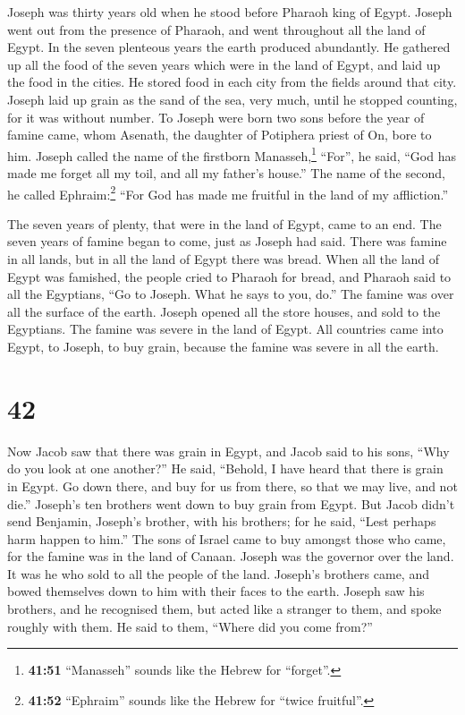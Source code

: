  Joseph was thirty years old when he stood before Pharaoh
king of Egypt. Joseph went out from the presence of Pharaoh, and went
throughout all the land of Egypt.  In the seven plenteous
years the earth produced abundantly.  He gathered up all
the food of the seven years which were in the land of Egypt, and laid up
the food in the cities. He stored food in each city from the fields
around that city.  Joseph laid up grain as the sand of
the sea, very much, until he stopped counting, for it was without
number.  To Joseph were born two sons before the year of
famine came, whom Asenath, the daughter of Potiphera priest of On, bore
to him.  Joseph called the name of the firstborn
Manasseh,\footnote{\textbf{41:51} ``Manasseh'' sounds like the Hebrew
  for ``forget''.} ``For'', he said, ``God has made me forget all my
toil, and all my father's house.''  The name of the
second, he called Ephraim:\footnote{\textbf{41:52} ``Ephraim'' sounds
  like the Hebrew for ``twice fruitful''.} ``For God has made me
fruitful in the land of my affliction.''

 The seven years of plenty, that were in the land of
Egypt, came to an end.  The seven years of famine began
to come, just as Joseph had said. There was famine in all lands, but in
all the land of Egypt there was bread.  When all the land
of Egypt was famished, the people cried to Pharaoh for bread, and
Pharaoh said to all the Egyptians, ``Go to Joseph. What he says to you,
do.''  The famine was over all the surface of the earth.
Joseph opened all the store houses, and sold to the Egyptians. The
famine was severe in the land of Egypt.  All countries
came into Egypt, to Joseph, to buy grain, because the famine was severe
in all the earth.

\hypertarget{section-41}{%
\section{42}\label{section-41}}

 Now Jacob saw that there was grain in Egypt, and Jacob
said to his sons, ``Why do you look at one another?''  He
said, ``Behold, I have heard that there is grain in Egypt. Go down
there, and buy for us from there, so that we may live, and not die.''
 Joseph's ten brothers went down to buy grain from Egypt.
 But Jacob didn't send Benjamin, Joseph's brother, with
his brothers; for he said, ``Lest perhaps harm happen to him.''
 The sons of Israel came to buy amongst those who came,
for the famine was in the land of Canaan.  Joseph was the
governor over the land. It was he who sold to all the people of the
land. Joseph's brothers came, and bowed themselves down to him with
their faces to the earth.  Joseph saw his brothers, and he
recognised them, but acted like a stranger to them, and spoke roughly
with them. He said to them, ``Where did you come from?''

